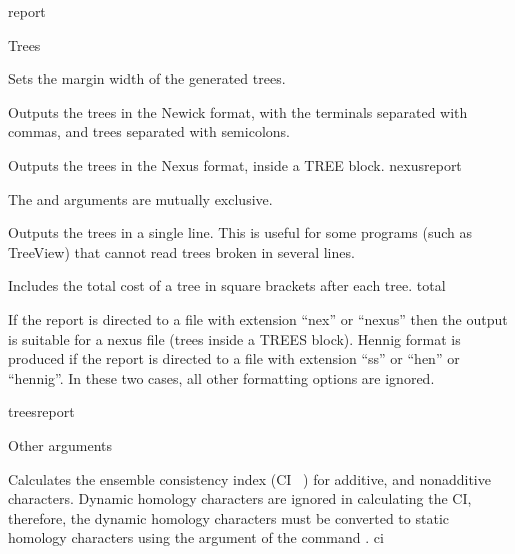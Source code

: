 \begin{command}{report}{}
\begin{arguments}
\begin{argumentgroup}{Trees}
{\begin{description}
                        {Sets the margin width of the generated trees.}
                        {}

                        {Outputs the trees in the Newick format, with the
                        terminals separated with commas, and trees separated
                        with semicolons.}
                        {}
                        
                        {Outputs the trees in the Nexus format, inside a TREE block.}
                        {nexusreport}
                    
                    \begin{statement}
                     The  and  arguments are 
                     mutually exclusive.
                     \end{statement}
	     
                   
                        {Outputs the trees in a single line. This is useful for
                        some programs (such as TreeView) that cannot read
                        trees broken in several
                        lines.}
                        {}
                                  
                        {Includes the total cost of a tree in square brackets after each tree.}
                        {total}
                        
                        
                    \end{description}
                If the report is directed
                to a file with extension ``nex'' or ``nexus'' then
                the output is suitable for a nexus file (trees inside a TREES
                block). Hennig format is produced if the report is directed
                to a file with extension ``ss'' or ``hen'' or ``hennig''. In
                these two cases, all other formatting options are ignored.}
                {treesreport}

		\end{argumentgroup}

		\begin{argumentgroup}{Other arguments}
			{} 

	      {Calculates the ensemble consistency index (CI ~\cite{farris1989,
	      klugeandfarris1969}) for additive, and nonadditive
	      characters. Dynamic homology characters are ignored in calculating
	      the CI, therefore, the dynamic homology characters must be converted
	      to static homology characters using the argument  
	      of the command .}
	      {ci}
	      

\end{argumentgroup}
\end{arguments}
\end{command}
